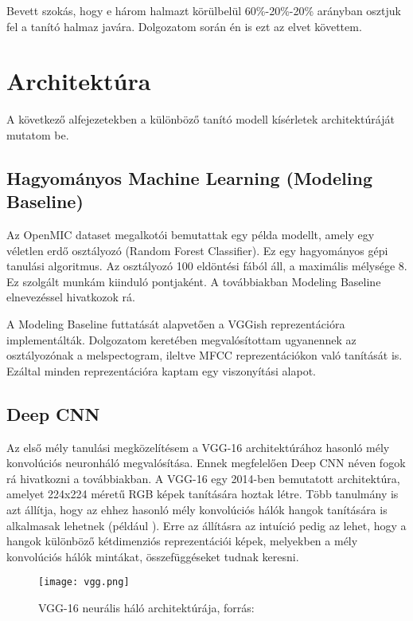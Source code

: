 Bevett szokás, hogy e három halmazt körülbelül 60\%-20\%-20\% arányban osztjuk fel a tanító halmaz javára. \cite{traintestvalid} Dolgozatom során én is ezt az elvet követtem.

\section{Architektúra}

A következő alfejezetekben a különböző tanító modell kísérletek architektúráját mutatom be.

\subsection{Hagyományos Machine Learning (Modeling Baseline)}

Az OpenMIC dataset megalkotói bemutattak egy példa modellt, amely egy véletlen erdő osztályozó (Random Forest Classifier). \cite{humphrey2018openmic} Ez egy hagyományos gépi tanulási algoritmus. Az osztályozó 100 eldöntési fából áll, a maximális mélysége 8. Ez szolgált munkám kiinduló pontjaként. A továbbiakban Modeling Baseline elnevezéssel hivatkozok rá.

A Modeling Baseline futtatását alapvetően a VGGish reprezentációra implementálták. Dolgozatom keretében megvalósítottam ugyanennek az osztályozónak a melspectogram, ileltve MFCC reprezentációkon való tanítását is. Ezáltal minden reprezentációra kaptam egy viszonyítási alapot.

\subsection{Deep CNN}

Az első mély tanulási megközelítésem a VGG-16 \cite{vgg} architektúrához hasonló mély konvolúciós neuronháló megvalósítása. Ennek megfelelően Deep CNN néven fogok rá hivatkozni a továbbiakban. A VGG-16 egy 2014-ben bemutatott architektúra, amelyet 224x224 méretű RGB képek tanítására hoztak létre. Több tanulmány is azt állítja, hogy az ehhez hasonló mély konvolúciós hálók hangok tanítására is alkalmasak lehetnek (például \cite{choi2017tutorial}). Erre az állításra az intuíció pedig az lehet, hogy a hangok különböző kétdimenziós reprezentációi képek, melyekben a mély konvolúciós hálók mintákat, összefüggéseket tudnak keresni.

\begin{figure}[H]
  \centering
  \texttt{[image: vgg.png]}
  \caption{VGG-16 neurális háló architektúrája, forrás: \cite{loukadakis2018}}
\end{figure}

